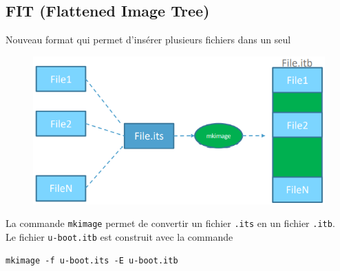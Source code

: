 \documentclass[resume]{subfiles}
\begin{document}
\subsection{FIT (Flattened Image Tree)}
Nouveau format qui permet d'insérer plusieurs fichiers dans un seul
\begin{figure}[H]
\centering
\includegraphics[width=0.75\columnwidth]{img_5.png}
\end{figure}
La commande \verb!mkimage! permet de convertir un fichier \verb!.its! en un fichier \verb!.itb!.\\
Le fichier \verb!u-boot.itb! est construit avec la commande
\begin{center}
\verb!mkimage -f u-boot.its -E u-boot.itb!
\end{center}
\end{document}
